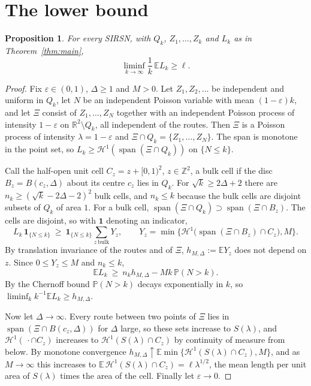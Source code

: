 \documentclass[11pt]{amsart}
\newtheorem{proposition}[theorem]{Proposition}
\theoremstyle{remark}
\newcommand{\R}{\mathbb{R}}
\newcommand{\Z}{\mathbb{Z}}
\newcommand{\E}{\mathbb{E}}
\newcommand{\Prob}{\mathbb{P}}
\newcommand{\Hone}{\mathcal{H}^1}
\newcommand{\spn}{\operatorname{span}}
\begin{document}
\section{The lower bound}\label{sec:lower}

\begin{proposition}\label{prop:lower}
For every SIRSN, with $Q_k$, $Z_1,\dots,Z_k$ and $L_k$ as in Theorem~\ref{thm:main},
\[
\liminf_{k\to\infty}\frac1k\,\E L_k\ge\ell .
\]
\end{proposition}

\begin{proof}
Fix $\varepsilon\in(0,1)$, $\Delta\ge1$ and $M>0$. Let $Z_1,Z_2,\dots$ be independent and uniform in $Q_k$, let $N$ be an
independent Poisson variable with mean $(1-\varepsilon)k$, and let $\Xi$ consist of $Z_1,\dots,Z_N$ together with an
independent Poisson process of intensity $1-\varepsilon$ on $\R^2\setminus Q_k$, all independent of the routes. Then
$\Xi$ is a Poisson process of intensity $\lambda=1-\varepsilon$ and $\Xi\cap Q_k=\{Z_1,\dots,Z_N\}$. The span is
monotone in the point set, so $L_k\ge\Hone(\spn(\Xi\cap Q_k))$ on $\{N\le k\}$.

Call the half-open unit cell $C_z=z+[0,1)^2$, $z\in\Z^2$, a bulk cell if the disc $B_z=B(c_z,\Delta)$ about its centre
$c_z$ lies in $Q_k$. For $\sqrt k\ge2\Delta+2$ there are $n_k\ge(\sqrt k-2\Delta-2)^2$ bulk cells, and $n_k\le k$ because the bulk cells are disjoint
subsets of $Q_k$ of area $1$. For a bulk cell, $\spn(\Xi\cap Q_k)\supset\spn(\Xi\cap B_z)$. The cells are disjoint,
so with $\mathbf 1$ denoting an indicator,
\[
L_k\,\mathbf 1_{\{N\le k\}}\ \ge\ \mathbf 1_{\{N\le k\}}\sum_{z\ \mathrm{bulk}}Y_z,\qquad
Y_z=\min\bigl\{\Hone\bigl(\spn(\Xi\cap B_z)\cap C_z\bigr),M\bigr\}.
\]
By translation invariance of the routes and of $\Xi$, $h_{M,\Delta}:=\E Y_z$ does not depend on $z$. Since $0\le Y_z\le
M$ and $n_k\le k$,
\[
\E L_k\ \ge\ n_kh_{M,\Delta}-Mk\,\Prob(N>k).
\]
By the Chernoff bound $\Prob(N>k)$ decays exponentially in $k$, so $\liminf_kk^{-1}\E L_k\ge h_{M,\Delta}$.

Now let $\Delta\to\infty$. Every route between two points of $\Xi$ lies in $\spn(\Xi\cap B(c_z,\Delta))$ for $\Delta$ large, so these
sets increase to $S(\lambda)$, and $\Hone(\,\cdot\cap C_z)$ increases to $\Hone(S(\lambda)\cap C_z)$ by continuity
of measure from below. By monotone convergence $h_{M,\Delta}\uparrow\E\min\{\Hone(S(\lambda)\cap C_z),M\}$, and as $M\to\infty$
this increases to $\E\,\Hone(S(\lambda)\cap C_z)=\ell\lambda^{1/2}$, the mean length per unit area of $S(\lambda)$
times the area of the cell. Finally let $\varepsilon\to0$.
\end{proof}
\end{document}
